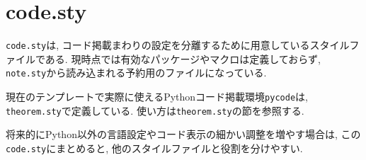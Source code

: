 \documentclass[../main.tex]{subfiles}
\begin{document}
\section{code.sty}

\texttt{code.sty}は, コード掲載まわりの設定を分離するために用意しているスタイルファイルである. 
現時点では有効なパッケージやマクロは定義しておらず, \texttt{note.sty}から読み込まれる予約用のファイルになっている. 

現在のテンプレートで実際に使えるPythonコード掲載環境\verb|pycode|は, \texttt{theorem.sty}で定義している. 
使い方は\texttt{theorem.sty}の節を参照する. 

将来的にPython以外の言語設定やコード表示の細かい調整を増やす場合は, この\texttt{code.sty}にまとめると, 他のスタイルファイルと役割を分けやすい. 
\end{document}
